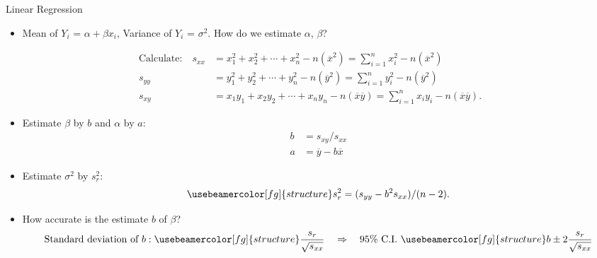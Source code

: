 \documentclass[10pt, xcolor=table]{beamer}
\newcommand*\themecol{\usebeamercolor[fg]{structure}}
\begin{document}
\begin{frame}{Linear Regression}
\small
\begin{itemize}
\setlength{\itemsep}{6pt}
\item Mean of $Y_i$ = $\alpha + \beta x_i$, Variance of $Y_i$ = $\sigma^2$. How do we estimate $\alpha$, $\beta$?
\end{itemize}
\begin{align*}
\text{Calculate:} \quad s_{xx} &= x_1^2 + x_2^2 + \cdots + x_n^2 - n(\overline{x}^2) = \sum_{i=1}^n x_i^2 - n(\overline{x}^2)\\
s_{yy} &= y_1^2 + y_2^2 + \cdots + y_n^2 - n(\overline{y}^2) = \sum_{i=1}^n y_i^2 - n(\overline{y}^2) \\
s_{xy} &= x_1y_1 + x_2y_2 + \cdots + x_ny_n - n(\overline{x}\overline{y}) = \sum_{i=1}^n x_i y_i - n(\overline{x}\overline{y}).
\end{align*}
\vspace{-0.25cm}
\begin{itemize}
\setlength{\itemsep}{8pt}
\item Estimate $\beta$ by $b$ and $\alpha$ by $a$:
{\themecol \begin{align*}
 b &= s_{xy}/s_{xx}\\
a &= \overline{y} - b\overline{x}
\end{align*}}
\vspace{-0.5cm}
\item Estimate $\sigma^2$ by $s_r^2$:
$${\themecol s_r^2 = (s_{yy} - b^2 s_{xx})/(n-2).}$$
\item How accurate is the estimate $b$ of $\beta$?
$$\text{Standard deviation of }b:{ \themecol \frac{s_r}{\sqrt{s_{xx}}}} \quad \Rightarrow \quad 95\% \text{ C.I. }{\themecol b \pm 2\frac{s_r}{\sqrt{s_{xx}}}}$$
\end{itemize}
\end{frame}
\end{document}
